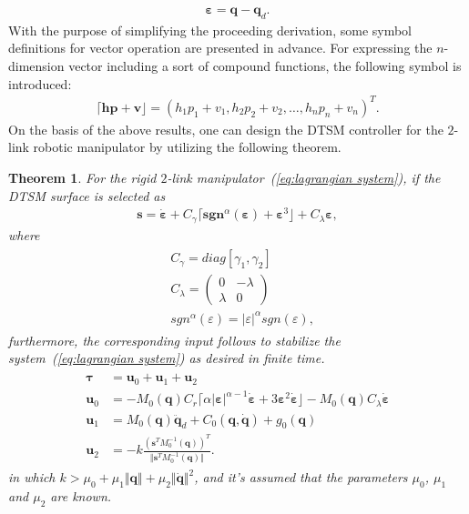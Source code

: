 \documentclass[3p]{elsarticle}
\theoremstyle{plain}
\newtheorem{mythm}{Theorem}
\theoremstyle{remark}
\begin{document}
\begin{align}
\bm \varepsilon = \bm q -\bm q_d.
\end{align}
With the purpose of simplifying the proceeding derivation, some symbol definitions for vector operation are presented in advance. For expressing the $n$-dimension vector including a sort of compound functions, the following symbol is introduced:
\begin{align*}
\lceil\bm h\bm p+\bm v\rfloor = (h_1p_1+v_1,h_2p_2+v_2,\ldots,h_np_n+v_n)^T.
\end{align*}
On the basis of the above results, one can design the DTSM controller for the $2$-link robotic manipulator by utilizing the following theorem.
\begin{mythm}\label{theorem:4}
For the rigid $2$-link manipulator~(\ref{eq:lagrangian system}), if the DTSM surface is selected as
\begin{align}
\bm s = \dot{\bm \varepsilon}+C_\gamma\lceil\bm{sgn}^\alpha(\bm \varepsilon)+\bm\varepsilon^3\rfloor+C_\lambda{\bm\varepsilon},\label{eq:lagrangian surface}
\end{align}
where
\begin{align}
\begin{split}
&C_\gamma=diag[\gamma_1,\gamma_2]\\
&C_\lambda=
\begin{pmatrix}
0 &-\lambda\\ \lambda &0
\end{pmatrix}\\
&{sgn}^\alpha(\varepsilon)=\vert\varepsilon\vert^\alpha sgn(\varepsilon),
\end{split}
\end{align}
furthermore, the corresponding input follows to stabilize the system~(\ref{eq:lagrangian system}) as desired in finite time.
\begin{align}
\begin{split}
\bm\tau &= \bm u_0+\bm u_1 +\bm u_2\\
\bm u_0 &= -M_0(\bm q)C_r\lceil\alpha\vert\bm\varepsilon\vert^{\alpha-1}\dot{\bm \varepsilon}+3\bm \varepsilon^2\dot{\bm \varepsilon}\rfloor-M_0(\bm q)C_\lambda\dot{\bm \varepsilon}\\
\bm u_1 &= M_0(\bm q)\ddot {\bm q}_d+C_0(\bm q,\dot {\bm q})+g_0(\bm q)\\
\bm u_2 &= -k\frac{(\bm s^TM_0^{-1}(\bm q))^T}{\Vert\bm s^TM_0^{-1}(\bm q)\Vert}.
\end{split}
\end{align}
in which $k>\mu_0+\mu_1\Vert\bm q\Vert+\mu_2\Vert\dot{\bm q}\Vert^2$, and it's assumed that the parameters $\mu_0$, $\mu_1$ and $\mu_2$ are known.
\end{mythm}
\end{document}
